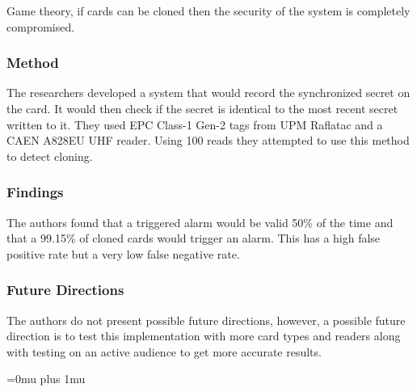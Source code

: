 \noindent
Game theory, if cards can be cloned then the security of the system is completely compromised.

\subsubsection{Method}

\noindent
The researchers developed a system that would record the synchronized secret on the card.  It would then check if the secret is identical to the most recent secret written to it.  They used EPC Class-1 Gen-2 tags from UPM Raflatac and a CAEN A828EU UHF reader.  Using 100 reads they attempted to use this method to detect cloning.

\subsubsection{Findings}

\noindent
The authors found that a triggered alarm would be valid 50\% of the time and that a 99.15\% of cloned cards would trigger an alarm.  This has a high false positive rate but a very low false negative rate.

\subsubsection{Future Directions}

\noindent
The authors do not present possible future directions, however, a possible future direction is to test this implementation with more card types and readers along with testing on an active audience to get more accurate results. 

\Urlmuskip=0mu plus 1mu\relax
\pagebreak
